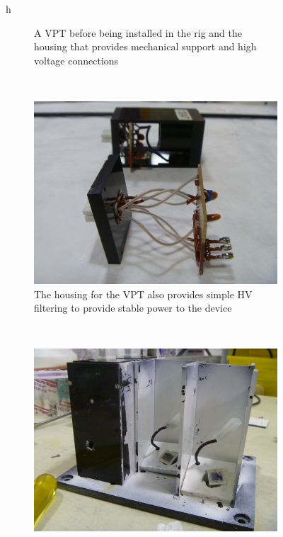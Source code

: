 \begin{figure}{h}
\begin{subfigure}[h]{0.450\textwidth}
        \caption{A VPT before being installed in the rig and the
          housing that provides mechanical support and high voltage connections}\label{fig:uva_vpt_rig_vpt_and_house}
      \end{subfigure}
       ~ %
    \begin{subfigure}[h]{0.450\textwidth}
        \includegraphics[width=\textwidth]{Figures/CMS_Diagrams/UVaRig__HV_filtering.JPG}
        \caption{The housing for the VPT also provides simple HV
          filtering to provide stable power to the device}\label{fig:uva_vpt_rig_hv_filter}
      \end{subfigure}
       ~ %
    \begin{subfigure}[h]{0.450\textwidth}
        \includegraphics[width=\textwidth]{Figures/CMS_Diagrams/UVaRig__PIN_and_Housing.JPG}

\end{subfigure}
\end{figure}
